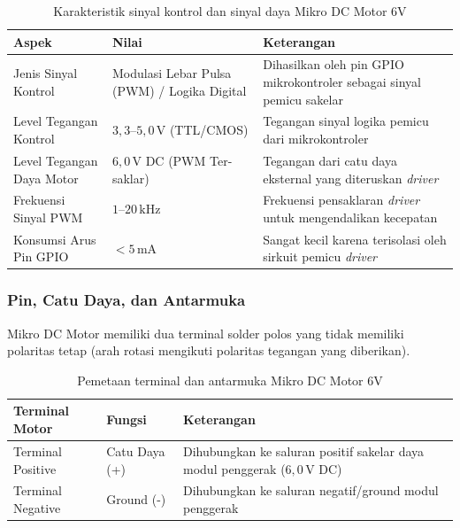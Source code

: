 \begin{table}[H]
	\centering
	\caption{Karakteristik sinyal kontrol dan sinyal daya Mikro DC Motor 6V}
	\label{tab:dc_motor_sinyal}
	\small
	\begin{tabularx}{\textwidth}{@{} p{3.0cm} >{\hsize=0.85\hsize}X >{\hsize=1.15\hsize}X @{}}
		\toprule
		Aspek                     & Nilai                                       & Keterangan                                                            \\
		\midrule
		Jenis Sinyal Kontrol      & Modulasi Lebar Pulsa (PWM) / Logika Digital & Dihasilkan oleh pin GPIO mikrokontroler sebagai sinyal pemicu sakelar \\
		Level Tegangan Kontrol    & $3{,}3\text{--}5{,}0\,\text{V}$ (TTL/CMOS)  & Tegangan sinyal logika pemicu dari mikrokontroler                     \\
		Level Tegangan Daya Motor & $6{,}0\,\text{V DC}$ (PWM Ter-saklar)       & Tegangan dari catu daya eksternal yang diteruskan \textit{driver}     \\
		Frekuensi Sinyal PWM      & $1\text{--}20\,\text{kHz}$                  & Frekuensi pensaklaran \textit{driver} untuk mengendalikan kecepatan   \\
		Konsumsi Arus Pin GPIO    & $< 5\,\text{mA}$                            & Sangat kecil karena terisolasi oleh sirkuit pemicu \textit{driver}    \\
		\bottomrule
	\end{tabularx}
\end{table}

\subsubsection{Pin, Catu Daya, dan Antarmuka}
Mikro DC Motor memiliki dua terminal solder polos yang tidak memiliki polaritas tetap (arah rotasi mengikuti polaritas tegangan yang diberikan).

\begin{table}[H]
	\centering
	\caption{Pemetaan terminal dan antarmuka Mikro DC Motor 6V}
	\label{tab:dc_motor_pin}
	\small
	\begin{tabularx}{\textwidth}{@{} p{3.2cm} p{2.2cm} X @{}}
		\toprule
		Terminal Motor    & Fungsi        & Keterangan                                                                         \\
		\midrule
		Terminal Positive & Catu Daya (+) & Dihubungkan ke saluran positif sakelar daya modul penggerak ($6{,}0\,\text{V DC}$) \\
		Terminal Negative & Ground (-)    & Dihubungkan ke saluran negatif/ground modul penggerak                              \\
		\bottomrule
	\end{tabularx}
\end{table}

